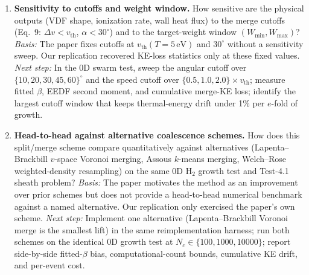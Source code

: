 \begin{enumerate}
  \item \textbf{Sensitivity to cutoffs and weight window.}
  How sensitive are the physical outputs (VDF shape, ionization rate, wall heat flux) to the merge cutoffs (Eq.~9: $\Delta v < v_{\mathrm{th}}$, $\alpha < 30^\circ$) and to the target-weight window $(W_{\min}, W_{\max})$?
  \emph{Basis:} The paper fixes cutoffs at $v_{\mathrm{th}}(T{=}5\,\mathrm{eV})$ and $30^\circ$ without a sensitivity sweep. Our replication recovered KE-loss statistics only at these fixed values.
  \emph{Next step:} In the 0D swarm test, sweep the angular cutoff over $\{10, 20, 30, 45, 60\}^\circ$ and the speed cutoff over $\{0.5, 1.0, 2.0\}\times v_{\mathrm{th}}$; measure fitted $\beta$, EEDF second moment, and cumulative merge-KE loss; identify the largest cutoff window that keeps thermal-energy drift under 1\% per $e$-fold of growth.

  \item \textbf{Head-to-head against alternative coalescence schemes.}
  How does this split/merge scheme compare quantitatively against alternatives (Lapenta--Brackbill $v$-space Voronoi merging, Assous $k$-means merging, Welch--Rose weighted-density resampling) on the same 0D H$_2$ growth test and Test-4.1 sheath problem?
  \emph{Basis:} The paper motivates the method as an improvement over prior schemes but does not provide a head-to-head numerical benchmark against a named alternative. Our replication only exercised the paper's own scheme.
  \emph{Next step:} Implement one alternative (Lapenta--Brackbill Voronoi merge is the smallest lift) in the same reimplementation harness; run both schemes on the identical 0D growth test at $N_c\in\{100, 1000, 10000\}$; report side-by-side fitted-$\beta$ bias, computational-count bounds, cumulative KE drift, and per-event cost.
\end{enumerate}
